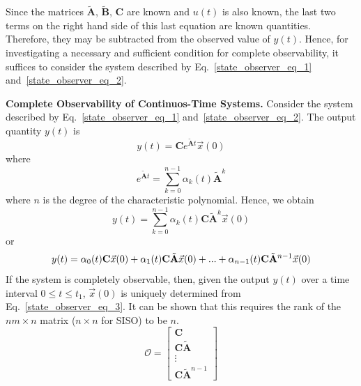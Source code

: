 \documentclass[12pt,a4paper,oneside]{book}
\begin{document}
\begin{onehalfspace}
Since the matrices $\tilde{\mathbf{A}}$, $\tilde{\mathbf{B}}$, $\mathbf{C}$ are 
known and 
$u(t)$ is also known, the last two terms on the right hand side of this last 
equation are known quantities. Therefore, they may be subtracted from the 
observed value of $y(t)$. Hence, for investigating a necessary and sufficient 
condition for complete observability, it suffices to consider the system 
described by Eq.~\eqref{state_observer_eq_1} and~\eqref{state_observer_eq_2}.

\vspace{5mm}
\textbf{Complete Observability of Continuos-Time Systems.} Consider the system 
described by Eq.~\eqref{state_observer_eq_1} and~\eqref{state_observer_eq_2}. 
The output quantity $y(t)$ is
\begin{equation}
y(t) = \mathbf{C}e^{\tilde{\mathbf{A}}t}\vec x(0)	
\end{equation}
where
\begin{equation}
	e^{\tilde{\mathbf{A}}t} = \sum_{k=0}^{n-1} \alpha_k(t)\tilde{\mathbf{A}}^k	
\end{equation}
where $n$ is the degree of the characteristic polynomial. 
Hence, we obtain
\begin{equation}
	y(t) = \sum_{k=0}^{n-1} \alpha_k(t)\mathbf{C}\tilde{\mathbf{A}}^k\vec x(0)
\end{equation}
or
\begin{equation} \label{state_observer_eq_3}
	y(t) = \alpha_0(t)\mathbf{C}\vec x(0) + 
	\alpha_1(t)\mathbf{C}\tilde{\mathbf{A}}\vec x(0) + ... + 
	\alpha_{n-1}(t)\mathbf{C}\tilde{\mathbf{A}}^{n-1}\vec x(0) \\
\end{equation}
If the system is completely observable, then, given the output $y(t)$ over a 
time interval $0 \leq t \leq t_1$, $\vec x(0)$ is uniquely determined from 
Eq.~\eqref{state_observer_eq_3}. It can be shown that this requires the rank of 
the $nm \times n$ matrix ($n \times n$ for SISO) to be $n$.
\begin{equation} \label{state_observer_eq_4}
\mathcal{O} = \begin{bmatrix}
	\mathbf{C}  \\
	\mathbf{C}\tilde{\mathbf{A}} \\
	\vdots \\
	\mathbf{C}\tilde{\mathbf{A}}^{n-1}
\end{bmatrix}
\end{equation}


\end{onehalfspace}
\end{document}
